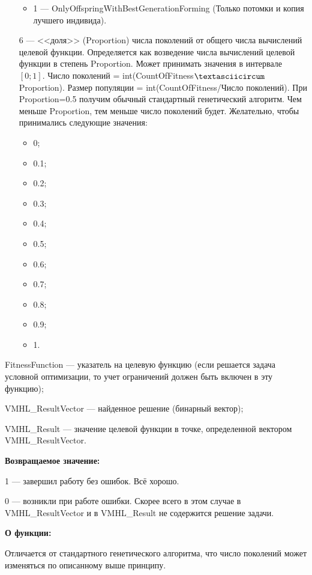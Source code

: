 \begin{itemize}
\begin{itemize}
       \item 1 --- OnlyOffspringWithBestGenerationForming (Только потомки и копия лучшего индивида).
	    \end{itemize}
		
 \item [6] --- <<доля>> (Proportion) числа поколений от общего числа вычислений целевой функции. Определяется как возведение числа вычислений целевой функции в степень Proportion. Может принимать значения в интервале $[0;1]$. Число поколений = int(CountOfFitness$\textasciicircum$Proportion). Размер популяции = int(CountOfFitness/Число поколений). При Proportion=0.5 получим обычный стандартный генетический алгоритм. Чем меньше Proportion, тем меньше число поколений будет. Желательно, чтобы принимались следующие значения:
  \begin{itemize}
       \item 0;
	   \item 0.1;
	   \item 0.2;
	   \item 0.3;
	   \item 0.4;
	   \item 0.5;
	   \item 0.6;
	   \item 0.7;
	   \item 0.8;
	   \item 0.9; 
       \item 1.
	    \end{itemize}
 \end{itemize}
 
FitnessFunction --- указатель на целевую функцию (если решается задача условной оптимизации, то учет ограничений должен быть включен в эту функцию);
 
VMHL\_ResultVector --- найденное решение (бинарный вектор);
 
VMHL\_Result --- значение целевой функции в точке, определенной вектором VMHL\_ResultVector.

\textbf{Возвращаемое значение:} 

 1 --- завершил работу без ошибок. Всё хорошо.
 
 0 --- возникли при работе ошибки. Скорее всего в этом случае в VMHL\_ResultVector и в VMHL\_Result не содержится решение задачи.

 
\textbf{О функции:}

Отличается от стандартного генетического алгоритма, что число поколений может изменяться по описанному выше принципу.

